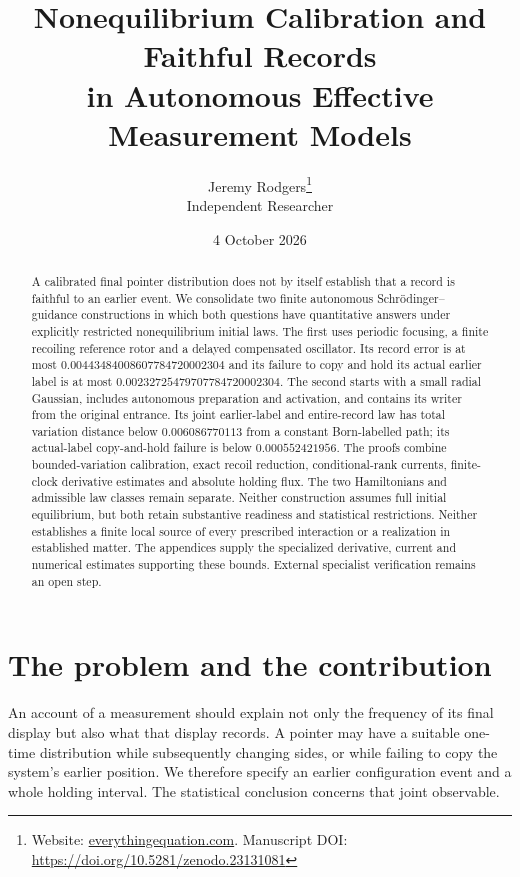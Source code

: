 \documentclass[11pt]{article}
\title{Nonequilibrium Calibration and Faithful Records\\in Autonomous Effective Measurement Models}
\author{Jeremy Rodgers\thanks{Website: \href{https://everythingequation.com}{everythingequation.com}. Manuscript DOI: \url{https://doi.org/10.5281/zenodo.23131081}}\\\small Independent Researcher}
\date{4 October 2026}
\theoremstyle{definition}\newtheorem{definition}[theorem]{Definition}
\theoremstyle{remark}\newtheorem{remark}[theorem]{Remark}
\begin{document}
\maketitle
\begin{abstract}
A calibrated final pointer distribution does not by itself establish that a
record is faithful to an earlier event. We consolidate two finite autonomous
Schr\"odinger--guidance constructions in which both questions have quantitative
answers under explicitly restricted nonequilibrium initial laws. The first uses
periodic focusing, a finite recoiling reference rotor and a delayed compensated
oscillator. Its record error is at most $0.00443484008607784720002304$ and its
failure to copy and hold its actual earlier label is at most
$0.00232725479707784720002304$. The second starts with a small radial Gaussian,
includes autonomous preparation and activation, and contains its writer from
the original entrance. Its joint earlier-label and entire-record law has total
variation distance below $0.006086770113$ from a constant Born-labelled path;
its actual-label copy-and-hold failure is below $0.000552421956$.
The proofs combine bounded-variation calibration, exact recoil reduction,
conditional-rank currents, finite-clock derivative estimates and absolute
holding flux. The two Hamiltonians and admissible law classes remain separate.
Neither construction assumes full initial equilibrium, but both retain
substantive readiness and statistical restrictions. Neither establishes a
finite local source of every prescribed interaction or a realization in
established matter. The appendices supply the specialized derivative, current and numerical
estimates supporting these bounds. External specialist verification remains
an open step.
\end{abstract}
\clearpage
\begingroup\small
\makeatletter{}\makeatother
\tableofcontents
\endgroup\clearpage

\section{The problem and the contribution}
An account of a measurement should explain not only the frequency of its final
display but also what that display records. A pointer may have a suitable
one-time distribution while subsequently changing sides, or while failing to
copy the system's earlier position. We therefore specify an earlier
configuration event and a whole holding interval. The statistical conclusion
concerns that joint observable.
\end{document}

